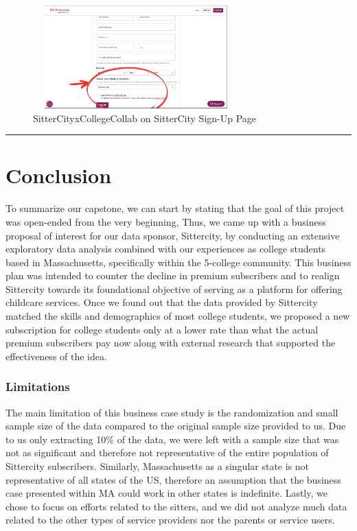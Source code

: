\documentclass[12pt]{article}
\begin{document}
\begin{figure}
  \centering
  \includegraphics[width=300px, height=150px]{IMAGES/UX2.png}
  \caption{SitterCityxCollegeCollab on SitterCity Sign-Up Page}
\end{figure}

\newpage

\begin{center}\rule{0.5\linewidth}{0.5pt}\end{center}

\newpage

\hypertarget{conclusion}{%
\section{Conclusion}\label{conclusion}}

To summarize our capstone, we can start by stating that the goal of this
project was open-ended from the very beginning, Thus, we came up with a
business proposal of interest for our data sponsor, Sittercity, by
conducting an extensive exploratory data analysis combined with our
experiences as college students based in Massachusetts, specifically
within the 5-college community. This business plan was intended to
counter the decline in premium subscribers and to realign Sittercity
towards its foundational objective of serving as a platform for offering
childcare services. Once we found out that the data provided by
Sittercity matched the skills and demographics of most college students,
we proposed a new subscription for college students only at a lower rate
than what the actual premium subscribers pay now along with external
research that supported the effectiveness of the idea.~

\hypertarget{limitations}{%
\subsubsection{\texorpdfstring{\textbf{Limitations}}{Limitations}}\label{limitations}}

The main limitation of this business case study is the randomization and
small sample size of the data compared to the original sample size
provided to us. Due to us only extracting 10\% of the data, we were left
with a sample size that was not as significant and therefore not
representative of the entire population of Sittercity subscribers.
Similarly, Massachusetts as a singular state is not representative of
all states of the US, therefore an assumption that the business case
presented within MA could work in other states is indefinite. Lastly, we
chose to focus on efforts related to the sitters, and we did not analyze
much data related to the other types of service providers nor the
parents or service users.~
\end{document}
